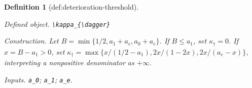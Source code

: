 \documentclass{article}
\newtheorem{definition}{Definition}
\begin{document}
\begin{definition}[def:deterioration-threshold]\label{def:deterioration-threshold}
\par\smallskip\noindent\emph{Defined object.} \texttt{\textbackslash{}\allowbreak{}kappa\_\allowbreak{}\{\textbackslash{}\allowbreak{}dagger\}\allowbreak{}}
\par\smallskip\noindent\emph{Construction.} Let \(B=\min\{1/2,a_1+a_e,a_0+a_e\}\). If \(B\le a_1\), set \(\kappa_{\dagger}=0\). If \(x=B-a_1>0\), set \(\kappa_{\dagger}=\max\{x/(1/2-a_1),2x/(1-2x),2x/(a_e-x)\}\), interpreting a nonpositive denominator as \(+\infty\).
\par\smallskip\noindent\emph{Inputs.} \texttt{a\_\allowbreak{}0}; \texttt{a\_\allowbreak{}1}; \texttt{a\_\allowbreak{}e}.
\end{definition}
\end{document}
